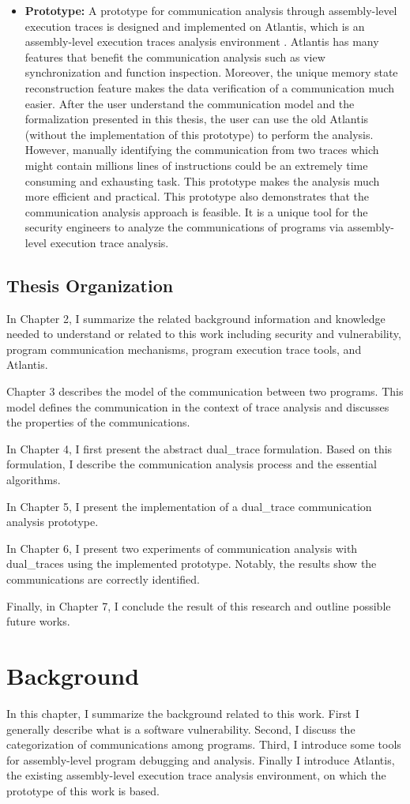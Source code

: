 \documentclass[12pt,oneside]{book}
\newcommand\startchapter[1]{\chapter{#1}\thispagestyle{myheadings}}
\begin{document}
\begin{itemize}
  \item \textbf{Prototype:} A prototype for communication analysis through assembly-level execution traces is designed and implemented on Atlantis, which is an assembly-level execution traces analysis environment \cite{huang2017atlantis}. Atlantis has many features that benefit the communication analysis such as view synchronization and function inspection. Moreover, the unique memory state reconstruction feature makes the data verification of a communication much easier. After the user understand the communication model and the formalization presented in this thesis, the user can use the old Atlantis (without the implementation of this prototype) to perform the analysis. However, manually identifying the communication from two traces which might contain millions lines of instructions could be an extremely time consuming and exhausting task. This prototype makes the analysis much more efficient and practical. This prototype also demonstrates that the communication analysis approach is feasible. It is a unique tool for the security engineers to analyze the communications of programs via assembly-level execution trace analysis. 
\end{itemize}

\section{Thesis Organization}
In Chapter 2, I summarize the related background information and knowledge needed to understand or related to this work including security and vulnerability, program communication mechanisms, program execution trace tools, and Atlantis. 

Chapter 3 describes the model of the communication between two programs. This model defines the communication in the context of trace analysis and discusses the properties of the communications. 

In Chapter 4, I first present the abstract dual\_trace formulation. Based on this formulation, I describe the communication analysis process and the essential algorithms.

In Chapter 5, I present the implementation of a dual\_trace communication analysis prototype. 

In Chapter 6, I present two experiments of communication analysis with dual\_traces using the implemented prototype. Notably, the results show the communications are correctly identified. 

Finally, in Chapter 7, I conclude the result of this research and outline possible future works.
	\startchapter{Background}
\label{chapter:Bac}
In this chapter, I summarize the background related to this work. First I generally describe what is a software vulnerability. Second, I discuss the categorization of communications among programs. Third, I introduce some tools for assembly-level program debugging and analysis. Finally I introduce Atlantis, the existing assembly-level execution trace analysis environment, on which the prototype of this work is based.
\end{document}
